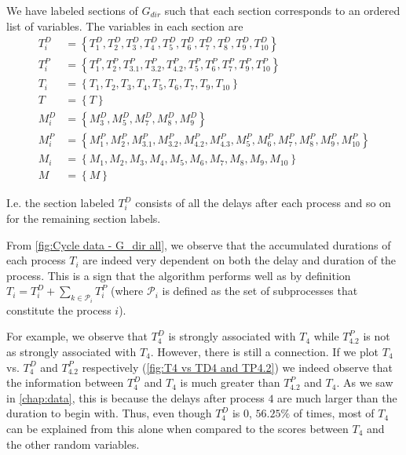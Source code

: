 \documentclass[../Thesis.tex]{subfiles}
\begin{document}
We have labeled sections of $G_{dir}$ such that each section corresponds to an ordered list of variables. The variables in each section are
\begin{equation}\label{eq:Cycle data sets of variables}
    \begin{aligned}
        T_i^D & = \left\{ T^D_1, T^D_2, T^D_3, T^D_4, T^D_5, T^D_6, T^D_7, T^D_8, T^D_9, T^D_{10} \right\}                                 \\
        T^P_i & = \left\{ T^P_1, T^P_2, T^P_{3.1}, T^P_{3.2}, T^P_{4.2}, T^P_{5}, T^P_{6}, T^P_{7}, T^P_9, T^P_{10}\right\}                \\
        T_i   & = \left\{T_1, T_2, T_3, T_4, T_5, T_6, T_7, T_9, T_{10}\right\}                                                            \\
        T     & = \left\{T\right\}                                                                                                         \\
        M^D_i & = \left\{ M^D_3, M^D_5, M^D_7, M^D_8, M^D_9 \right\}                                                                       \\
        M^P_i & = \left\{ M^P_1, M^P_2, M^P_{3.1}, M^P_{3.2}, M^P_{4.2}, M^P_{4.3}, M^P_{5}, M^P_6, M^P_7, M^P_8, M^P_9, M^P_{10} \right\} \\
        M_i   & = \left\{M_1, M_2, M_3, M_4, M_5, M_6, M_7, M_8, M_9, M_{10}\right\}                                                       \\
        M     & = \left\{M\right\}
    \end{aligned}
\end{equation}

I.e. the section labeled $T^D_i$ consists of all the delays after each process and so on for the remaining section labels.


From \autoref{fig:Cycle data - G_dir all}, we observe that the accumulated durations of each process $T_i$ are indeed very dependent on both the delay and duration of the process. This is a sign that the algorithm performs well as by definition $T_i = T^D_i + \sum_{k\in \mathcal{P}_i} T^P_i$ (where $\mathcal{P}_i$ is defined as the set of subprocesses that constitute the process $i$).

For example, we observe that $T^D_4$ is strongly associated with $T_4$ while $T^P_{4.2}$ is not as strongly associated with $T_4$. However, there is still a connection. If we plot $T_4$ vs. $T^D_4$ and $T^P_{4.2}$ respectively (\autoref{fig:T4 vs TD4 and TP4.2}) we indeed observe that the information between $T^D_4$ and $T_4$ is much greater than $T^P_{4.2}$ and $T_4$. As we saw in \autoref{chap:data}, this is because the delays after process $4$ are much larger than the duration to begin with. Thus, even though $T^D_4$ is $0$, $56.25\%$ of times, most of $T_4$ can be explained from this alone when compared to the scores between $T_4$ and the other random variables.
\end{document}

